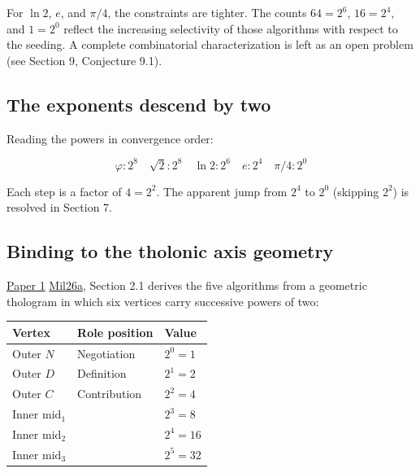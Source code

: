 \documentclass[12pt]{article}
\begin{document}
For \(\ln 2\), \(e\), and \(\pi/4\), the constraints are tighter. The
counts \(64 = 2^6\), \(16 = 2^4\), and \(1 = 2^0\) reflect the
increasing selectivity of those algorithms with respect to the seeding.
A complete combinatorial characterization is left as an open problem
(see Section 9, Conjecture 9.1).

\subsection{The exponents descend by two}\label{the-exponents-descend-by-two}

Reading the powers in convergence order:

\[
\varphi: 2^8 \quad \sqrt{2}: 2^8 \quad \ln 2: 2^6 \quad e: 2^4 \quad \pi/4: 2^0
\]

Each step is a factor of \(4 = 2^2\). The apparent jump from \(2^4\) to
\(2^0\) (skipping \(2^2\)) is resolved in Section 7.

\subsection{Binding to the tholonic axis geometry}\label{binding-to-the-tholonic-axis-geometry}

\href{https://github.com/baardev/truevalue/blob/main/docnav/Research/papers/1_recursive-tholonic-five-constants/1_recursive-tholonic-five-constants.pdf}{Paper
1}
\href{https://github.com/baardev/truevalue/blob/main/docnav/Research/papers/1_recursive-tholonic-five-constants/1_recursive-tholonic-five-constants.pdf}{Mil26a},
Section 2.1 derives the five algorithms from a geometric thologram in
which six vertices carry successive powers of two:

\begin{longtable}[]{@{}lll@{}}
\toprule\noalign{}
Vertex & Role position & Value \\
\midrule\noalign{}
\endhead
\bottomrule\noalign{}
\endlastfoot
Outer \(N\) & Negotiation & \(2^0 = 1\) \\
Outer \(D\) & Definition & \(2^1 = 2\) \\
Outer \(C\) & Contribution & \(2^2 = 4\) \\
Inner \(\mathrm{mid}_1\) & & \(2^3 = 8\) \\
Inner \(\mathrm{mid}_2\) & & \(2^4 = 16\) \\
Inner \(\mathrm{mid}_3\) & & \(2^5 = 32\) \\
\end{longtable}
\end{document}
